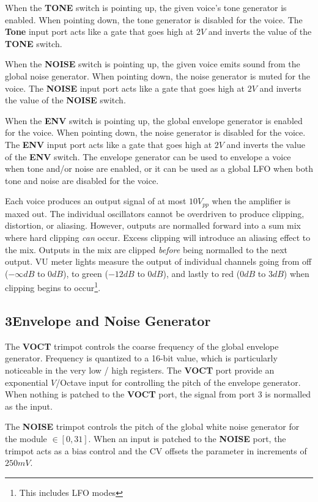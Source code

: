 \documentclass[12pt,letter]{article}
\begin{document}
When the \textbf{TONE} switch is pointing up, the given voice's tone generator is enabled. When pointing down, the tone generator is disabled for the voice. The \textbf{Tone} input port acts like a gate that goes high at $2V$ and inverts the value of the \textbf{TONE} switch.

When the \textbf{NOISE} switch is pointing up, the given voice emits sound from the global noise generator. When pointing down, the noise generator is muted for the voice. The \textbf{NOISE} input port acts like a gate that goes high at $2V$ and inverts the value of the \textbf{NOISE} switch.

When the \textbf{ENV} switch is pointing up, the global envelope generator is enabled for the voice. When pointing down, the noise generator is disabled for the voice. The \textbf{ENV} input port acts like a gate that goes high at $2V$ and inverts the value of the \textbf{ENV} switch. The envelope generator can be used to envelope a voice when tone and/or noise are enabled, or it can be used as a global LFO when both tone and noise are disabled for the voice.

Each voice produces an output signal of at most $10V_{pp}$ when the amplifier is maxed out. The individual oscillators cannot be overdriven to produce clipping, distortion, or aliasing. However, outputs are normalled forward into a sum mix where hard clipping \textit{can} occur. Excess clipping will introduce an aliasing effect to the mix. Outputs in the mix are clipped \textit{before} being normalled to the next output. VU meter lights measure the output of individual channels going from off ($-\infty dB$ to $0dB$), to green ($-12dB$ to $0dB$), and lastly to red ($0dB$ to $3dB$) when clipping begins to occur\footnote{This includes LFO modes}.

\subsection*{3{\quad}Envelope and Noise Generator}

The \textbf{VOCT} trimpot controls the coarse frequency of the global envelope generator. Frequency is quantized to a 16-bit value, which is particularly noticeable in the very low / high registers. The \textbf{VOCT} port provide an exponential $V$/Octave input for controlling the pitch of the envelope generator. When nothing is patched to the \textbf{VOCT} port, the signal from port 3 is normalled as the input.

The \textbf{NOISE} trimpot controls the pitch of the global white noise generator for the module $\in [0, 31]$. When an input is patched to the \textbf{NOISE} port, the trimpot acts as a bias control and the CV offsets the parameter in increments of $250mV$.
\end{document}
